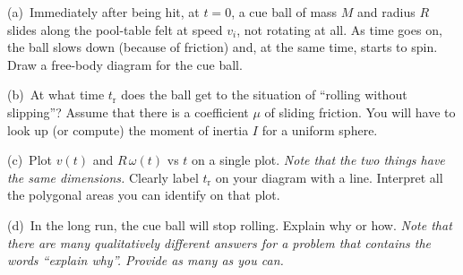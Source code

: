 \documentclass[12pt]{article}
\begin{document}
\pottheader

\begin{list}{}{}
\item{(a)}~Immediately after being hit, at $t=0$, a cue ball of mass
$M$ and radius $R$ slides along the pool-table felt at speed $v_i$, not rotating
at all.  As time goes on, the ball slows down (because of friction)
and, at the same time, starts to spin.  Draw a free-body diagram for
the cue ball.

\item{(b)}~At what time $t_\mathrm{r}$ does the ball get to the
situation of ``rolling without slipping''?  Assume that there is a
coefficient $\mu$ of sliding friction. You will have to look up (or
compute) the moment of inertia $I$ for a uniform sphere.

\item{(c)}~Plot $v(t)$ and $R\,\omega(t)$ vs $t$ on a single plot.
\emph{Note that the two things have the same
dimensions.}  Clearly label $t_\mathrm{r}$ on your diagram with a
line.
Interpret all the polygonal areas you can identify on that plot.

\item{(d)}~In the long run, the cue ball will stop rolling. Explain
why or how. \emph{Note that there are many qualitatively different
answers for a problem that contains the words ``explain why''.
Provide as many as you can.}
\end{list}

\pottfooter
\end{document}
